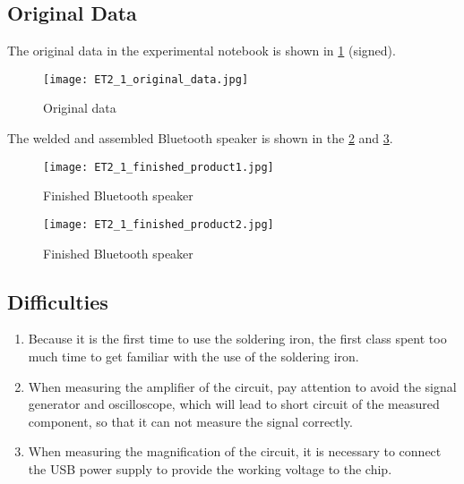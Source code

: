 \clearpage
\subsection{Original Data}
The original data in the experimental notebook is shown in \cref{fig:fig-o} (signed).

\begin{figure}[htbp]
	\centering
	\texttt{[image: ET2\_1\_original\_data.jpg]}
	\caption{Original data}
	\label{fig:fig-o}
\end{figure}

\clearpage
The welded and assembled Bluetooth speaker is shown in the \cref{fig:finished_product1} and \cref{fig:finished_product2}.

\begin{figure}[htbp]
	\centering
	\texttt{[image: ET2\_1\_finished\_product1.jpg]}
	\caption{Finished Bluetooth speaker}
	\label{fig:finished_product1}
\end{figure}

\begin{figure}[htbp]
	\centering
	\texttt{[image: ET2\_1\_finished\_product2.jpg]}
	\caption{Finished Bluetooth speaker}
	\label{fig:finished_product2}
\end{figure}




\subsection{Difficulties}
\begin{enumerate}
	\item Because it is the first time to use the soldering iron, the first class spent too much time to get familiar with the use of the soldering iron.
	\item When measuring the amplifier of the circuit, pay attention to avoid the signal generator and oscilloscope, which will lead to short circuit of the measured component, so that it can not measure the signal correctly.
	\item When measuring the magnification of the circuit, it is necessary to connect the USB power supply to provide the working voltage to the chip.
\end{enumerate}
